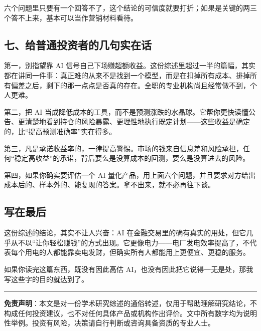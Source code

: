 \documentclass[11pt,a4paper]{ctexart}
\begin{document}
六个问题里只要有一个回答不了，这个结论的可信度就要打折；如果是关键的两三个答不上来，基本可以当作营销材料看待。

\subsection*{七、给普通投资者的几句实在话}

第一，别指望靠 AI 信号自己下场赚超额收益。这份综述里超过一半的篇幅，其实都在讲同一件事：真正难的从来不是找到一个模型，而是在扣掉所有成本、排掉所有偏差之后，剩下的那一点点是否真的存在。全职的专业机构尚且经常做不到，个人更难。

第二，把 AI 当成降低成本的工具，而不是预测涨跌的水晶球。它帮你更快读懂公告、更清楚地看到持仓的风险暴露、更理性地执行既定计划——这些收益是确定的，比“提高预测准确率”实在得多。

第三，凡是承诺收益率的，一律提高警惕。市场的钱来自信息差和风险承担，任何“稳定高收益”的承诺，背后要么是没算成本的回测，要么是没算进去的风险。

第四，如果你确实要评估一个 AI 量化产品，用上面六个问题，并且要求对方给出成本后的、样本外的、能复现的答案。拿不出来，就不必再往下谈。

\subsection*{写在最后}

这份综述的结论，其实不让人兴奋：AI 在金融交易里的确有真实的用处，但它几乎从不以“让你轻松赚钱”的方式出现。它更像电力——电厂发电效率提高了，不代表每个用电的人都能靠卖电发财，但确实所有人都能用上更便宜、更稳的服务。

如果你读完这篇东西，既没有因此高估 AI，也没有因此把它说得一无是处，那我写这些字的目的就达到了。

\vspace{0.6em}
\noindent\rule{\textwidth}{0.4pt}

\noindent\textbf{免责声明}：本文是对一份学术研究综述的通俗转述，仅用于帮助理解研究结论，不构成任何投资建议，也不对任何具体产品或机构作出评价。文中所有数字均为说明性举例。投资有风险，决策请自行判断或咨询具备资质的专业人士。
\end{document}
